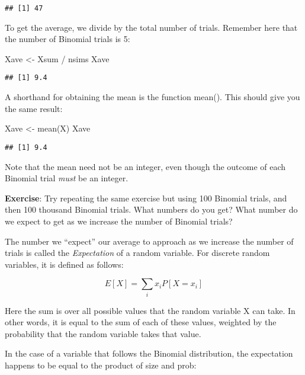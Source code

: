 \documentclass[
]{book}
\newenvironment{Shaded}{\begin{snugshade}}{\end{snugshade}}
\newcommand{\FunctionTok}[1]{\textcolor[rgb]{0.00,0.00,0.00}{#1}}
\newcommand{\NormalTok}[1]{#1}
\newcommand{\OtherTok}[1]{\textcolor[rgb]{0.56,0.35,0.01}{#1}}
\newcommand{\SpecialCharTok}[1]{\textcolor[rgb]{0.00,0.00,0.00}{#1}}
\begin{document}
\begin{verbatim}
## [1] 47
\end{verbatim}

To get the average, we divide by the total number of trials. Remember here that the number of Binomial trials is 5:

\begin{Shaded}
\begin{Highlighting}[]
\NormalTok{Xave }\OtherTok{\textless{}{-}}\NormalTok{ Xsum }\SpecialCharTok{/}\NormalTok{ nsims}
\NormalTok{Xave}
\end{Highlighting}
\end{Shaded}

\begin{verbatim}
## [1] 9.4
\end{verbatim}

A shorthand for obtaining the mean is the function mean(). This should give you the same result:

\begin{Shaded}
\begin{Highlighting}[]
\NormalTok{Xave }\OtherTok{\textless{}{-}} \FunctionTok{mean}\NormalTok{(X)}
\NormalTok{Xave}
\end{Highlighting}
\end{Shaded}

\begin{verbatim}
## [1] 9.4
\end{verbatim}

Note that the mean need not be an integer, even though the outcome of each Binomial trial \emph{must} be an integer.

\textbf{Exercise}: Try repeating the same exercise but using 100 Binomial trials, and then 100 thousand Binomial trials. What numbers do you get? What number do we expect to get as we increase the number of Binomial trials?

The number we ``expect'' our average to approach as we increase the number of trials is called the \emph{Expectation} of a random variable. For discrete random variables, it is defined as follows:

\[E[X] = \sum_{i}x_iP[X=x_i]\]

Here the sum is over all possible values that the random variable X can take. In other words, it is equal to the sum of each of these values, weighted by the probability that the random variable takes that value.

In the case of a variable that follows the Binomial distribution, the expectation happens to be equal to the product of size and prob:
\end{document}
